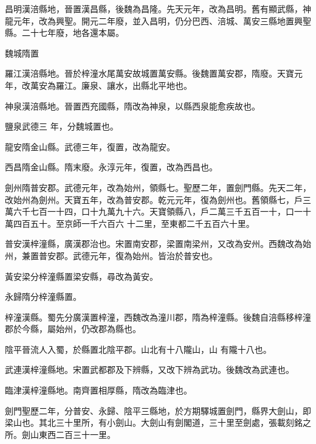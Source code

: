 \begin{pinyinscope}
 昌明漢涪縣地，晉置漢昌縣，後魏為昌隆。先天元年，改為昌明。舊有顯武縣，神龍元年，改為興聖。開元二年廢，並入昌明，仍分巴西、涪城、萬安三縣地置興聖縣。二十七年廢，地各還本屬。



 魏城隋置



 羅江漢涪縣地。晉於梓潼水尾萬安故城置萬安縣。後魏置萬安郡，隋廢。天寶元年，改萬安為羅江。廉泉、讓水，出縣北平地也。



 神泉漢涪縣地。晉置西充國縣，隋改為神泉，以縣西泉能愈疾故也。



 鹽泉武德三
 年，分魏城置也。



 龍安隋金山縣。武德三年，復置，改為龍安。



 西昌隋金山縣。隋末廢。永淳元年，復置，改為西昌也。



 劍州隋普安郡。武德元年，改為始州，領縣七。聖歷二年，置劍門縣。先天二年，改始州為劍州。天寶五年，改為普安郡。乾元元年，復為劍州也。舊領縣七，戶三萬六千七百一十四，口十九萬九十六。天寶領縣八，戶二萬三千五百一十，口一十萬四百五十。至京師一千六百六
 十二里，至東都二千五百六十里。



 普安漢梓潼縣，廣漢郡治也。宋置南安郡，梁置南梁州，又改為安州。西魏改為始州，兼置普安郡。武德元年，復為始州。皆治於普安也。



 黃安梁分梓潼縣置梁安縣，尋改為黃安。



 永歸隋分梓潼縣置。



 梓潼漢縣。蜀先分廣漢置梓潼，西魏改為潼川郡，隋為梓潼縣。後魏自涪縣移梓潼郡於今縣，屬始州，仍改郡為縣也。



 陰平晉流人入蜀，於縣置北陰平郡。山北有十八隴山，山
 有隴十八也。



 武連漢梓潼縣地。宋置武都郡及下辨縣，又改下辨為武功。後魏改為武連也。



 臨津漢梓潼縣地。南齊置相厚縣，隋改為臨津也。



 劍門聖歷二年，分普安、永歸、陰平三縣地，於方期驛城置劍門，縣界大劍山，即梁山也。其北三十里所，有小劍山。大劍山有劍閣道，三十里至劍處，張載刻銘之所。劍山東西二百三十一里。




\end{pinyinscope}
